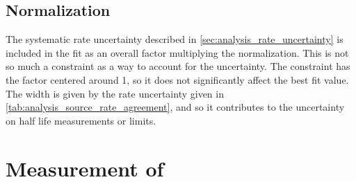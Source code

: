 \documentclass[herrin-thesis.tex]{subfiles}
\begin{document}
\subsection{Normalization}
The systematic rate uncertainty described in \cref{sec:analysis_rate_uncertainty} is included in the fit as an overall factor multiplying the normalization. This is not so much a constraint as a way to account for the uncertainty. The constraint has the factor centered around 1, so it does not significantly affect the best fit value. The width is given by the rate uncertainty given in \cref{tab:analysis_source_rate_agreement}, and so it contributes to the uncertainty on half life measurements or limits.

\section{Measurement of \twonu}
\end{document}
